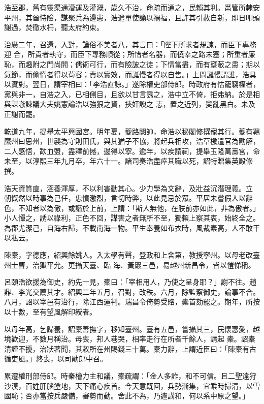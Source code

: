 \begin{pinyinscope}
 浩至郡，舊有靈渠通漕運及灌溉，歲久不治，命疏而通之，民賴其利。邕管所隸安平州，其酋恃險，謀聚兵為邊患，浩遣單使諭以禍福，且許其引赦自新，即日叩頭謝過，焚徹水柵，聽太府約束。



 治廣二年，召還，入對，論俗不美者八，其言曰：「陛下所求者規諫，而臣下專務迎
 合，所貴者執守，而臣下專務順從；所惜者名器，而僥幸之路未塞；所重者廉恥，而趣附之門尚開；儒術可行，而有險詖之徒；下情當盡，而有壅蔽之患；期以氣節，而偷惰者得以茍容；責以實效，而誕慢者得以自售。」上問誕慢謂誰，浩具以實對。翌日，謂宰相曰：「李浩直諒。」遂除權吏部侍郎。時政府有怙寵竊權者，黨與非一，自浩之入，已相側目，且欲以甘言誘之，浩中立不倚，拒弗納。於是相與謀嗾諫議大夫姚憲論浩以強狠之資，挾奸諛之
 志，置之近列，變亂黑白。未及正謝而罷。



 乾道九年，提舉太平興國宮。明年夏，夔路闕帥，命浩以秘閣修撰寵其行。夔有羈縻州曰思州，世襲為守則田氏，與其猶子不協，將起兵相攻，浩草檄遣官為勸解，二人感悟，歃血盟，盡釋前憾，邊得以寧。逾年，以疾請祠，提舉玉隆萬壽宮，命未至，以淳熙三年九月卒，年六十一。諸司奏浩盡瘁其職以死，詔特贈集英殿修撰。



 浩天資質直，涵養渾厚，不以利害動其心。少力學為文辭，及壯益沉潛理義。立
 朝慨然以時事為己任，忠憤激烈，言切時弊，以此見忌於眾。平居未嘗假人以辭色，不知者以為傲，或譖於上前，上謂：「斯人無他，在朕前亦如此，非為傲者。」小人憚之，誘以祿利，正色不回，謀害之者無所不至，獨賴上察其衷，始終全之。為郡尤潔己，自海右歸，不載南海一物。平生奉養如布衣時，風裁素高，人不敢干以私云。



 陳橐，字德應，紹興餘姚人。入太學有聲，登政和上舍第，教授寧州。以母老改臺州士曹，治獄平允。更攝天臺、臨
 海、黃巖三邑，易越州新昌令，皆以愷悌稱。



 呂頤浩欲援為御史，約先一見，橐曰：「宰相用人，乃使之呈身耶？」謝不往。趙鼎、李光交薦其才。紹興二年五月，召對，改秩。六月，除監察御史，論事不合。八月，詔以宰邑有治行，除江西運判。瑞昌令倚勢受賂，橐首劾罷之。期年，所按以十數，至有望風解印綬者。



 以母年高，乞歸養，詔橐善撫字，移知臺州。臺有五邑，嘗攝其三，民懷惠愛，越境歡迎，不數月稱治。母喪，邦人巷哭，相率走行在所者千餘人，請起
 橐。詔橐清謹不擾，治狀著聞，其敕所在州賜錢三十萬。橐力辭，上謂近臣曰：「陳橐有古循吏風。」終喪，以司勛郎中召。



 累遷權刑部侍郎。時秦檜力主和議，橐疏謂：「金人多詐，和不可信。且二聖遠狩沙漠，百姓肝腦塗地，天下痛心疾首。今天意既回，兵勢漸集，宜乘時掃清，以雪國恥；否亦當按兵嚴備，審勢而動。舍此不為，乃遽講和，何以系中原之望。」




\end{pinyinscope}
